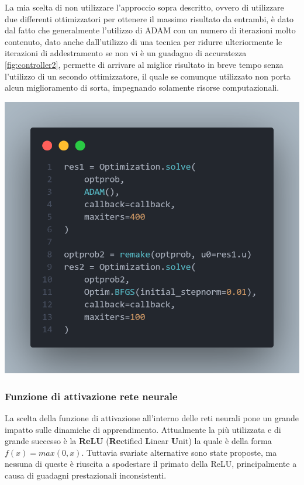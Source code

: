 La mia scelta di non utilizzare l'approccio sopra descritto, ovvero di utilizzare due differenti ottimizzatori per 
ottenere il massimo risultato da entrambi, è dato dal fatto che generalmente l'utilizzo di ADAM 
con un numero di iterazioni molto contenuto, dato anche dall'utilizzo di una tecnica per ridurre ulteriormente
le iterazioni di addestramento se non vi è un guadagno di accuratezza \ref{fig:controller2}, 
permette di arrivare al miglior risultato in breve tempo senza l'utilizzo di un 
secondo ottimizzatore, il quale se comunque utilizzato non porta alcun 
miglioramento di sorta, impegnando solamente risorse computazionali.

\begin{minipage}{\linewidth}
	\centering
	\includegraphics[width=\textwidth]{img/optimizers_example.png}
	\label{fig:two_otpimizers}
\end{minipage}

\subsubsection*{Funzione di attivazione rete neurale}
La scelta della funzione di attivazione all'interno delle reti neurali pone un grande impatto sulle 
dinamiche di apprendimento. Attualmente la più utilizzata e di grande successo è la \textbf{ReLU}
(\textbf{Re}ctified \textbf{L}inear \textbf{U}nit) la quale è della forma $f(x) = max(0,x)$. 
Tuttavia svariate alternative sono state proposte, ma nessuna di queste è riuscita a 
spodestare il primato della ReLU, principalmente a causa di guadagni prestazionali inconsistenti. 

